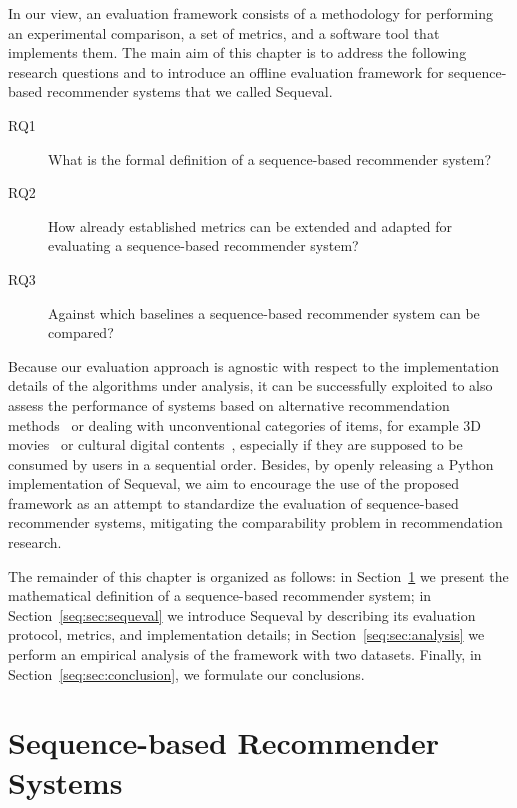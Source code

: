 In our view, an evaluation framework consists of a methodology for performing an experimental comparison, a set of metrics, and a software tool that implements them. The main aim of this chapter is to address the following research questions and to introduce an offline evaluation framework for sequence-based recommender systems that we called Sequeval.

\begin{description}
\item[RQ1\label{seq:itm:rq1}] What is the formal definition of a sequence-based recommender system?
\item[RQ2\label{seq:itm:rq2}] How already established metrics can be extended and adapted for evaluating a sequence-based recommender system?
\item[RQ3\label{seq:itm:rq3}] Against which baselines a sequence-based recommender system can be compared?
\end{description}

Because our evaluation approach is agnostic with respect to the implementation details of the algorithms under analysis, it can be successfully exploited to also assess the performance of systems based on alternative recommendation methods~\cite{Costa2011} or dealing with unconventional categories of items, for example 3D movies~\cite{Pouli2015} or cultural digital contents~\cite{Albanese2011}, especially if they are supposed to be consumed by users in a sequential order. Besides, by openly releasing a Python implementation of Sequeval, we aim to encourage the use of the proposed framework as an attempt to standardize the evaluation of sequence-based recommender systems, mitigating the comparability problem in recommendation research.

The remainder of this chapter is organized as follows: in Section~\ref{seq:sec:sequence-based} we present the mathematical definition of a sequence-based recommender system; in Section~\ref{seq:sec:sequeval} we introduce Sequeval by describing its evaluation protocol, metrics, and implementation details; in Section~\ref{seq:sec:analysis} we perform an empirical analysis of the framework with two datasets. Finally, in Section~\ref{seq:sec:conclusion}, we formulate our conclusions.

\section{Sequence-based Recommender Systems}
\label{seq:sec:sequence-based}

